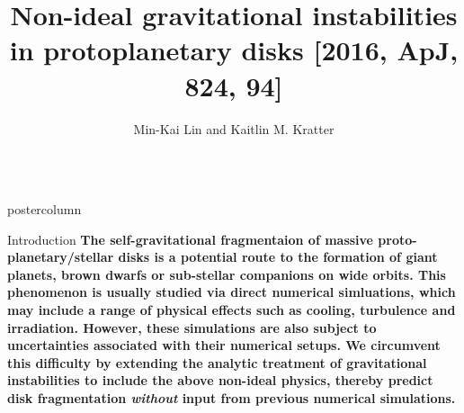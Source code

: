 \documentclass[final,hyperref={pdfpagelabels=false}]{beamer}
\title{{\huge Non-ideal gravitational instabilities in protoplanetary
    disks [2016, ApJ, 824, 94]}}
\author{Min-Kai Lin and Kaitlin M. Kratter}%
\institute[UA]{minkailin@email.arizona.edu, kkratter@email.arizona.edu}
\newlength{\columnheight}
\begin{document}
\captionsetup[subfigure]{labelformat=empty}

\begin{frame}
  \begin{columns}
    \begin{column}{.49\textwidth}
      \begin{beamercolorbox}[center,wd=\textwidth]{postercolumn}
        \begin{minipage}[T]{.95\textwidth}  %
          \parbox[t][\columnheight]{\textwidth}{ %
            \begin{block}{{\Large Introduction}}
              \justifying
              {\large              
                {\bf
                  The self-gravitational fragmentaion of massive
                  proto-planetary/stellar disks is a potential
                  route to the formation of giant planets, brown
                  dwarfs or sub-stellar companions on wide
                  orbits. This phenomenon is usually studied via
                  direct numerical simluations, which may include a
                  range of physical 
                  effects such as cooling, turbulence and 
                  irradiation. However, these simulations are also
                  subject to uncertainties associated with their 
                  numerical setups. We circumvent this difficulty by
                  extending the   
                  analytic treatment of gravitational instabilities 
                  to include the above non-ideal physics, thereby 
                  predict disk fragmentation \emph{without}
                  input from previous numerical simulations. 
                }
              }
            \end{block}
            
}
\end{minipage}
\end{beamercolorbox}
\end{column}
\end{columns}
\end{frame}
\end{document}
